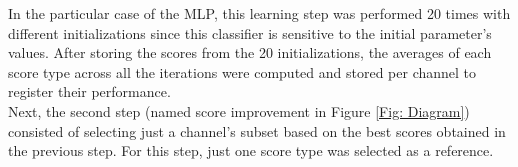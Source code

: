 \begin{center}
\end{center}

In the particular case of the MLP, this learning step was performed 20 times with different initializations since this classifier is sensitive to the initial parameter's values. After storing the scores from the 20 initializations, the averages of each score type across all the iterations were computed and stored per channel to register their performance.\\

Next, the second step (named score improvement in Figure \ref{Fig: Diagram}) consisted of selecting just a channel's subset based on the best scores obtained in the previous step. For this step, just one score type was selected as a reference.\\

